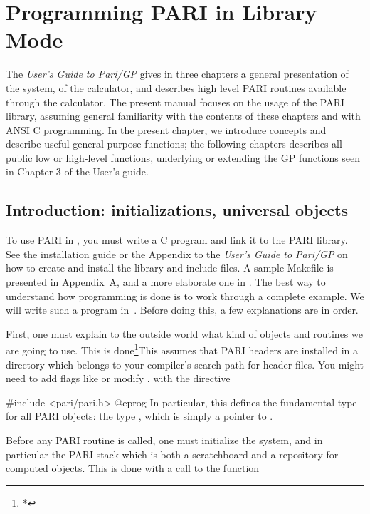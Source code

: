 %
%
\chapter{Programming PARI in Library Mode}

\noindent The \emph{User's Guide to Pari/GP} gives in three chapters a
general presentation of the system, of the  calculator, and describes
high level PARI routines available through the calculator. The
present manual focuses on the usage of the PARI library, assuming
general familiarity with the contents of these chapters and with ANSI C
programming. In the present chapter, we introduce concepts and describe
useful general purpose functions; the following chapters describes all public
low or high-level functions, underlying or extending the GP functions seen in
Chapter 3 of the User's guide.

\section{Introduction: initializations, universal objects}
\label{se:intro4}

\noindent
To use PARI in , you must write a C program and link it to
the PARI library. See the installation guide or the Appendix to the
\emph{User's Guide to Pari/GP} on how to create and install the library and
include files. A sample Makefile is presented in Appendix~A, and a more
elaborate one in . The best way to understand how
programming is done is to work through a complete example. We will write such
a program in~. Before doing this, a few explanations are in
order.

First, one must explain to the outside world what kind of objects and
routines we are going to use. This is done\footnote{*}{This assumes that PARI
headers are installed in a directory which belongs to your compiler's search
path for header files. You might need to add flags like
 or modify .}
with the directive

\bprog
#include <pari/pari.h>
@eprog
\noindent
In particular, this defines the fundamental type for all PARI objects: the
type , which is simply a pointer to .

Before any PARI routine is called, one must initialize the system, and in
particular the PARI stack which is both a scratchboard and a repository for
computed objects. This is done with a call to the function

